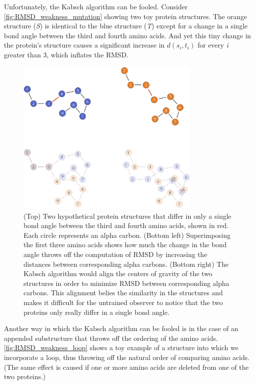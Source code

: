 Unfortunately, the Kabsch algorithm can be fooled. Consider \autoref{fig:RMSD_weakness_mutation} showing two toy protein structures. The orange structure (\textit{S}) is identical to the blue structure (\textit{T}) except for a change in a single bond angle between the third and fourth amino acids. And yet this tiny change in the protein's structure causes a significant increase in $d(s_{i}, t_{i})$ for every \textit{i} greater than 3, which inflates the RMSD.

\begin{figure}[p]
	\centering
	\mySfFamily
	\includegraphics[width = 0.8\textwidth]{../images/RMSD_weakness_mutation.png}
	\caption{(Top) Two hypothetical protein structures that differ in only a single bond angle between the third and fourth amino acids, shown in red. Each circle represents an alpha carbon. (Bottom left) Superimposing the first three amino acids shows how much the change in the bond angle throws off the computation of RMSD by increasing the distances between corresponding alpha carbons. (Bottom right) The Kabsch algorithm would align the centers of gravity of the two structures in order to minimize RMSD between corresponding alpha carbons. This alignment belies the similarity in the structures and makes it difficult for the untrained observer to notice that the two proteins only really differ in a single bond angle.}
	\label{fig:RMSD_weakness_mutation}
\end{figure}

Another way in which the Kabsch algorithm can be fooled is in the case of an appended substructure that throws off the ordering of the amino acids. \autoref{fig:RMSD_weakness_loop} shows a toy example of a structure into which we incorporate a loop, thus throwing off the natural order of comparing amino acids. (The same effect is caused if one or more amino acids are deleted from one of the two proteins.)\\

